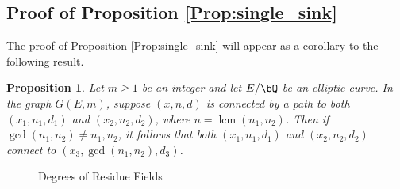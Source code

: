 \documentclass[11pt,reqno]{amsart}
\theoremstyle{plain}
\newtheorem{proposition}[theorem]{Proposition}
\theoremstyle{definition}
\DeclareMathOperator{\lcm}{lcm}
\newcommand{\Q}{\bQ}
\newcommand{\abedit}[1]{{\color{blue} #1}}
\begin{document}
\subsection{Proof of Proposition \ref{Prop:single_sink}}
The proof of Proposition \ref{Prop:single_sink} will appear as a corollary to the following result.

\begin{proposition}\label{Prop:gcd}
Let $m\geq 1$ be an integer and let $E/\Q$ be an elliptic curve. In the graph $G(E,m)$,
suppose $(x,n,d)$ is connected by a path to both $(x_1,n_1,d_1)$ and $(x_2,n_2,d_2)$, where $n=\lcm(n_1,n_2)$. Then \abedit{if $\gcd(n_1,n_2) \neq n_1,n_2$}, it follows that both $(x_1,n_1,d_1)$ and $(x_2,n_2,d_2)$ connect to $(x_3, \gcd(n_1,n_2),d_3)$.

\end{proposition}

%        
%
    
        \begin{figure}[h] 
        \begin{center}
        \end{center}
        \caption{Degrees of Residue Fields}
    \end{figure}
    
\end{document}
